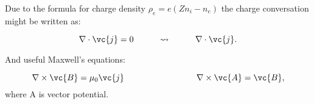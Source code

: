 Due to the formula for charge density $\rho_e = e (Z n_i - n_e)$ the charge conversation might be written as:

\begin{equation}
	\nabla \cdot \vc{j} = 0 \hspace*{1 cm} \leadsto \hspace*{1 cm} \nabla \cdot \vc{j}.
\end{equation}

And useful Maxwell's equations:

\begin{equation}
	\nabla \times \vc{B} = \mu_0 \vc{j}
	\hspace*{3cm} \nabla \times \vc{A} = \vc{B},
\end{equation}
where A is vector potential.